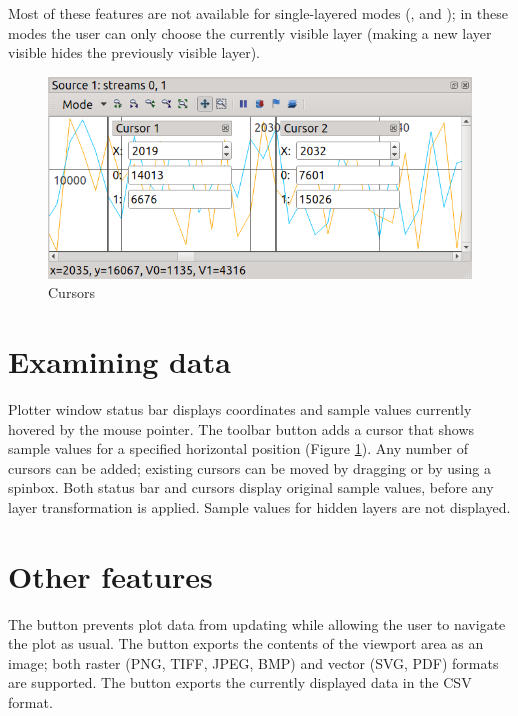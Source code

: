 \documentclass[a4paper,12pt,twoside,extrafontsizes]{memoir}
\begin{document}
Most of these features are not available for single-layered modes (,  and ); in these modes the user can only choose the currently visible layer (making a new layer visible hides the previously visible layer).

\begin{figure}[htbp]
\centering
\includegraphics{images/plottercursors.png}
\caption{Cursors}
\label{fig:plottercursors}
\end{figure}

\section{Examining data}

Plotter window status bar displays coordinates and sample values currently hovered by the mouse pointer. The  toolbar button adds a cursor that shows sample values for a specified horizontal position (Figure \ref{fig:plottercursors}). Any number of cursors can be added; existing cursors can be moved by dragging or by using a spinbox. Both status bar and cursors display original sample values, before any layer transformation is applied. Sample values for hidden layers are not displayed.

\section{Other features}

The  button prevents plot data from updating while allowing the user to navigate the plot as usual. The  button exports the contents of the viewport area as an image; both raster (PNG, TIFF, JPEG, BMP) and vector (SVG, PDF) formats are supported. The  button exports the currently displayed data in the CSV format.
\end{document}
